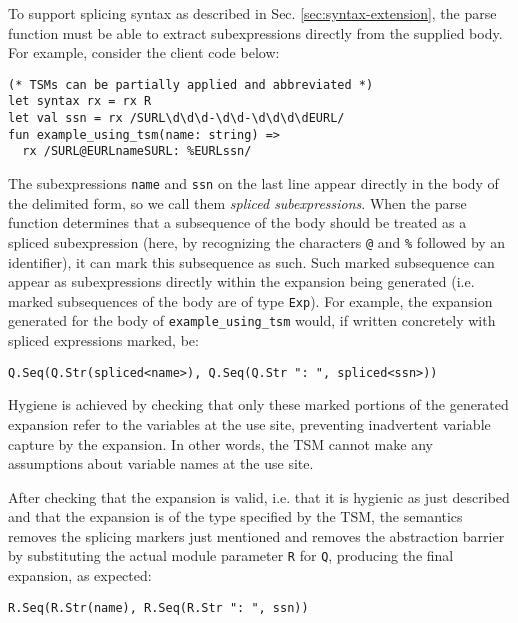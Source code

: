 To support splicing syntax as described in Sec. \ref{sec:syntax-extension}, the parse function must be able to extract subexpressions directly from the supplied body. For example, consider the client code below:
\begin{lstlisting}[numbers=none]
(* TSMs can be partially applied and abbreviated *)
let syntax rx = rx R
let val ssn = rx /SURL\d\d\d-\d\d-\d\d\d\dEURL/
fun example_using_tsm(name: string) => 
  rx /SURL@EURLnameSURL: %EURLssn/
\end{lstlisting}
The subexpressions \lstinline{name} and \lstinline{ssn} on the last line appear directly in the body of the delimited form, so we call them \emph{spliced subexpressions}. When the parse function determines that a subsequence of the body should be treated as a spliced subexpression (here, by recognizing the characters \lstinline{@} and \lstinline{%} followed by an  identifier), 
it can mark this subsequence as such. Such marked subsequence can appear as subexpressions directly within the expansion being generated (i.e. marked subsequences of the body are of type \lstinline{Exp}). For example, the expansion generated for the body of \lstinline{example_using_tsm} would, if written concretely with spliced expressions marked, be:
\begin{lstlisting}[numbers=none]
Q.Seq(Q.Str(spliced<name>), Q.Seq(Q.Str ": ", spliced<ssn>))
\end{lstlisting}
Hygiene is achieved by checking that only these marked portions of the generated expansion refer to the variables at the use site, preventing inadvertent variable capture by the expansion. In other words, the TSM cannot make any assumptions about variable names at the use site.%

After checking that the expansion is valid, i.e. that it is hygienic as just described and that the expansion is of the type specified by the TSM, the semantics removes the splicing markers just mentioned and removes the abstraction barrier by substituting  the actual module parameter \lstinline{R} for \lstinline{Q}, producing the final expansion, as expected:
\begin{lstlisting}[numbers=none]
R.Seq(R.Str(name), R.Seq(R.Str ": ", ssn))\end{lstlisting}

